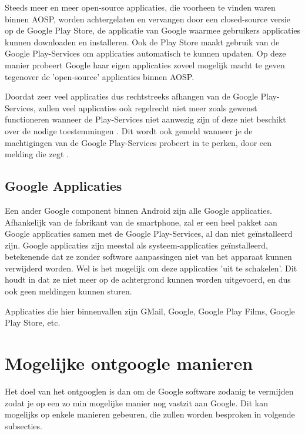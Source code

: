 Steeds meer en meer open-source applicaties, die voorheen te vinden waren binnen AOSP, worden achtergelaten en vervangen door een closed-source versie op de Google Play Store, de applicatie van Google waarmee gebruikers applicaties kunnen downloaden en installeren. Ook de Play Store maakt gebruik van de Google Play-Services om applicaties automatisch te kunnen updaten. Op deze manier probeert Google haar eigen applicaties zoveel mogelijk macht te geven tegenover de 'open-source' applicaties binnen AOSP. \autocite{amadeo_open-source}

Doordat zeer veel applicaties dus rechtstreeks afhangen van de Google Play-Services, zullen veel applicaties ook regelrecht niet meer zoals gewenst functioneren wanneer de Play-Services niet aanwezig zijn of deze niet beschikt over de nodige toestemmingen \autocite{marshall_google-play-services}. Dit wordt ook gemeld wanneer je de machtigingen van de Google Play-Services probeert in te perken, door een melding die zegt .

\subsection{Google Applicaties}

Een ander Google component binnen Android zijn alle Google applicaties. Afhankelijk van de fabrikant van de smartphone, zal er een heel pakket aan Google applicaties samen met de Google Play-Services, al dan niet geïnstalleerd zijn. Google applicaties zijn meestal als systeem-applicaties geïnstalleerd, betekenende dat ze zonder software aanpassingen niet van  het apparaat kunnen verwijderd worden. Wel is het mogelijk om deze applicaties 'uit te schakelen'. Dit houdt in dat ze niet meer op de achtergrond kunnen worden uitgevoerd, en dus ook geen meldingen kunnen sturen.

Applicaties die hier binnenvallen zijn GMail, Google, Google Play Films, Google Play Store, etc.

\section{Mogelijke ontgoogle manieren}

Het doel van het ontgooglen is dan om de Google software zodanig te vermijden zodat je op  een zo min mogelijke manier nog vastzit aan Google. Dit kan mogelijks op enkele manieren gebeuren, die zullen worden besproken in volgende subsecties.

